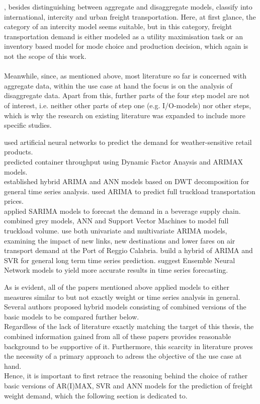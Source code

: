 \documentclass[a4paper, 11pt]{article}
\begin{document}
\cite{Regan.2001}, besides distinguishing between aggregate and disaggregate models, classify into international, intercity and urban freight transportation. Here, at first glance, the category of an intercity model seems suitable, but in this category, freight transportation demand is either modeled as a utility maximisation task or an inventory based model for mode choice and production decision, which again is not the scope of this work.
\\
\\
Meanwhile,  since, as mentioned above, most literature so far is concerned with aggregate data, within the use case at hand the focus is on the analysis of disaggregate data. 
Apart from this, further parts of the four step model are not of interest, i.e. neither other parts of step one (e.g. I/O-models) nor other steps, which is why the research on existing literature was expanded to include more specific studies. 

\cite{Taghizadeh.2017} used artificial neural networks to predict the demand for weather-sensitive retail products. \\
\cite{Intihar.2017} predicted container throughput using Dynamic Factor Anaysis and ARIMAX models.\\
\cite{Khandelwal.2015} established hybrid ARIMA and ANN models based on DWT decomposition for general time series analysis.
\cite{Miller.2018} used ARIMA to predict full truckload transportation prices.\\
\cite{Mircetic.2016} applied SARIMA models to forecast the demand in a beverage supply chain.\\
\cite{Gao.2011} combined grey models, ANN and Support Vector Machines to model full truckload volume.
\cite{Andreoni.2006b} use both univariate and multivariate ARIMA models, examining the impact of new links, new destinations and lower fares on air transport demand at the Port of Reggio Calabria.
\cite{JoaoF.L.Oliveira.2014} build a hybrid of ARIMA and SVR for general long term time series prediction.
\cite{Kourentzes.2014} suggest Ensemble Neural Network models to yield more accurate results in time series forecasting.

As is evident, all of the papers mentioned above applied models to either measures similar to but not exactly weight or time series analysis in general. Several authors proposed hybrid models consisting of combined versions of the basic models to be compared further below. \\
Regardless of the lack of literature exactly matching the target of this thesis, the combined information gained from all of these papers provides reasonable background to be supportive of it. Furthermore, this scarcity in literature proves the necessity of a primary approach to adress the objective of the use case at hand.\\
Hence, it is important to first retrace the reasoning behind the choice of rather basic versions of AR(I)MAX, SVR and ANN models for the prediction of freight weight demand, which the following section is dedicated to.\\
\end{document}
